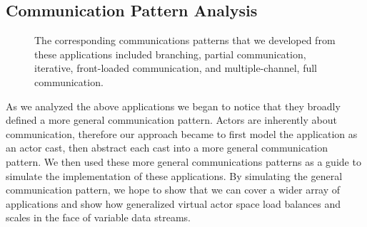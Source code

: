 \documentclass[conference,twocolumn,10pt]{IEEEtran}
\begin{document}
\subsection{Communication Pattern Analysis}

\begin{figure}[!t]
    \centering
    \hfil
    \hfil
    \caption{The corresponding communications patterns that we developed from these applications included branching, partial communication, iterative, front-loaded communication, and multiple-channel, full communication.}
    \label{fig:communications_patterns}
\end{figure}

As we analyzed the above applications we began to notice that they broadly defined a more general communication pattern. Actors are inherently about communication, therefore our approach became to first model the application as an actor cast, then abstract each cast into a more general communication pattern. We then used these more general communications patterns as a guide to simulate the implementation of these applications. By simulating the general communication pattern, we hope to show that we can cover a wider array of applications and show how generalized virtual actor space load balances and scales in the face of variable data streams.
\end{document}
